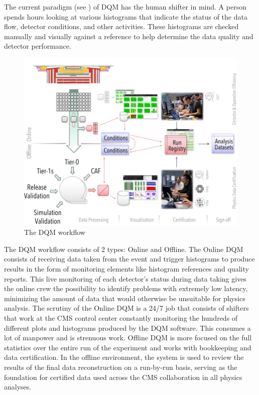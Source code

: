 The current paradigm (see ) of DQM has the human shifter in mind. A person spends hours looking at various histograms that indicate the status of the data flow, detector conditions, and other activities. These histograms are checked manually and visually against a reference to help determine the data quality and detector performance.
\begin{figure}
	\centering
	\includegraphics[width=.89\linewidth]{Images/DQM Workflow.png}
	\caption{The DQM workflow}
	\label{fig:DQM_workflow}
\end{figure}
The DQM workflow consists of 2 types: Online and Offline.
The Online DQM consists of receiving data taken from the event and trigger histograms to produce results in the form of monitoring elements like histogram references and quality reports. This live monitoring of each detector’s status during data taking gives the online crew the possibility to identify problems with extremely low latency, minimizing the amount of data that would otherwise be unsuitable for physics analysis. The scrutiny of the Online DQM is a 24/7 job that consists of shifters that work at the CMS control center constantly monitoring the hundreds of different plots and histograms produced by the DQM software. This consumes a lot of manpower and is strenuous work.
Offline DQM is more focused on the full statistics over the entire run of the experiment and works with bookkeeping and data certification. In the offline environment, the system is used to review the results of the final data reconstruction on a run-by-run basis, serving as the foundation for certified data used across the CMS collaboration in all physics analyses.


